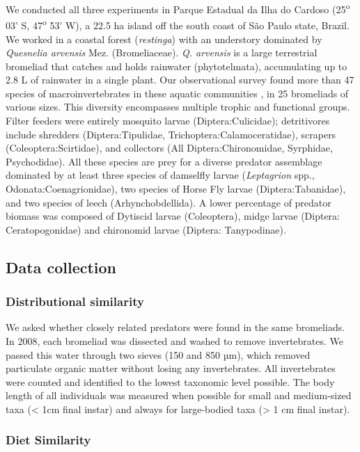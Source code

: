 We conducted all three experiments in Parque Estadual da Ilha do Cardoso
(25\textsuperscript{o} 03' S, 47\textsuperscript{o} 53' W), a 22.5 ha
island off the south coast of São Paulo state, Brazil. We worked in a
coastal forest (\emph{restinga}) with an understory dominated by
\emph{Quesnelia arvensis} Mez. (Bromeliaceae). \emph{Q. arvensis} is a
large terrestrial bromeliad that catches and holds rainwater
(phytotelmata), accumulating up to 2.8 L of rainwater in a single plant.
Our observational survey found more than 47 species of
macroinvertebrates in these aquatic communities \citep{Romero2010}, in
25 bromeliads of various sizes. This diversity encompasses multiple
trophic and functional groups. Filter feeders were entirely mosquito
larvae (Diptera:Culicidae); detritivores include shredders
(Diptera:Tipulidae, Trichoptera:Calamoceratidae), scrapers
(Coleoptera:Scirtidae), and collectors (All Diptera:Chironomidae,
Syrphidae, Psychodidae). All these species are prey for a diverse
predator assemblage dominated by at least three species of damselfly
larvae (\emph{Leptagrion} spp., Odonata:Coenagrionidae), two species of
Horse Fly larvae (Diptera:Tabanidae), and two species of leech
(Arhynchobdellida). A lower percentage of predator biomass was composed
of Dytiscid larvae (Coleoptera), midge larvae (Diptera: Ceratopogonidae)
and chironomid larvae (Diptera: Tanypodinae).

\subsection{Data collection}\label{data-collection}

\subsubsection{Distributional
similarity}\label{distributional-similarity}

We asked whether closely related predators were found in the same
bromeliads. In 2008, each bromeliad was dissected and washed to remove
invertebrates. We passed this water through two sieves (150 and 850 µm),
which removed particulate organic matter without losing any
invertebrates. All invertebrates were counted and identified to the
lowest taxonomic level possible. The body length of all individuals was
measured when possible for small and medium-sized taxa (\textless{} 1cm
final instar) and always for large-bodied taxa (\textgreater{} 1 cm
final instar).

\subsubsection{Diet Similarity}\label{diet-similarity}


